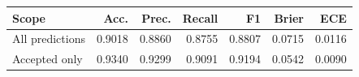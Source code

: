 \begin{tabular}{lrrrrrr}
\toprule
Scope & Acc. & Prec. & Recall & F1 & Brier & ECE \\
\midrule
All predictions & 0.9018 & 0.8860 & 0.8755 & 0.8807 & 0.0715 & 0.0116 \\
Accepted only & 0.9340 & 0.9299 & 0.9091 & 0.9194 & 0.0542 & 0.0090 \\
\bottomrule
\end{tabular}
